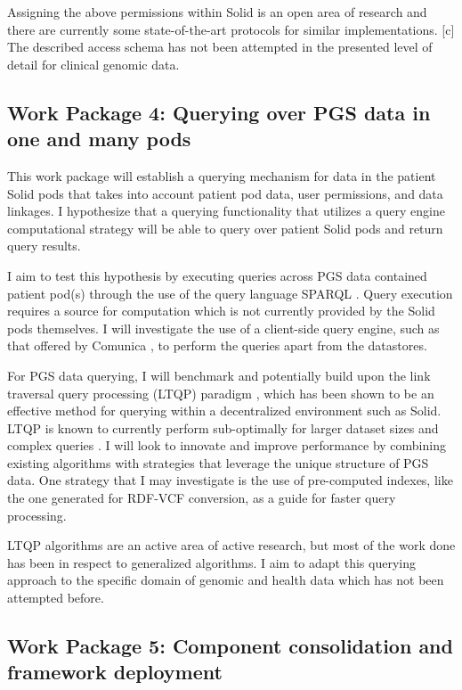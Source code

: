 \documentclass[runningheads]{llncs}
\begin{document}
Assigning the above permissions within Solid is an open area of research and there are currently some state-of-the-art protocols for similar implementations. [c]
The described access schema has not been attempted in the presented level of detail for clinical genomic data.


\subsection{Work Package 4: Querying over PGS data in one and many pods}

This work package will establish a querying mechanism for data in the patient Solid pods that takes into account patient pod data, user permissions, and data linkages. 
I hypothesize that a querying functionality that utilizes a query engine computational strategy will be able to query over patient Solid pods and return query results.

I aim to test this hypothesis by executing queries across PGS data contained patient pod(s) through the use of the query language SPARQL \cite{sparql}.
Query execution requires a source for computation which is not currently provided by the Solid pods themselves.
I will investigate the use of a client-side query engine, such as that offered by Comunica \cite{comunica}, to perform the queries apart from the datastores.

For PGS data querying, I will benchmark and potentially build upon the link traversal query processing (LTQP) paradigm \cite{taelman_evaluation_2023}, which has been shown to be an effective method for querying within a decentralized environment such as Solid. 
LTQP is known to currently perform sub-optimally for larger dataset sizes and complex queries \cite{taelman_evaluation_2023}. 
I will look to innovate and improve performance by combining existing algorithms with strategies that leverage the unique structure of PGS data.
One strategy that I may investigate is the use of pre-computed indexes, like the one generated for RDF-VCF conversion, as a guide for faster query processing.

LTQP algorithms are an active area of active research, but most of the work done has been in respect to generalized algorithms.
I aim to adapt this querying approach to the specific domain of genomic and health data which has not been attempted before. 


\subsection{Work Package 5: Component consolidation and framework deployment}
\end{document}

